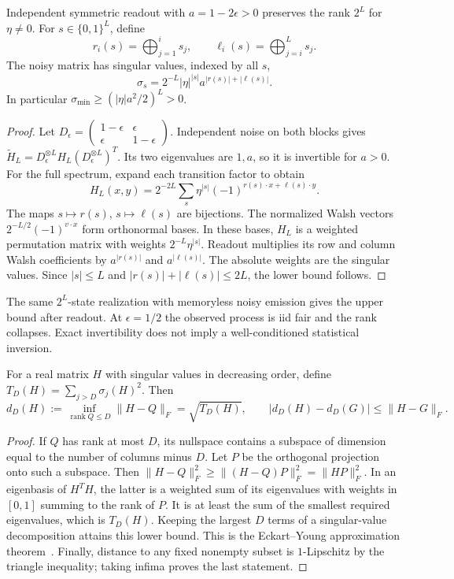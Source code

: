 \begin{theorem}\label{op:noisy-rank}
Independent symmetric readout with \(a=1-2\epsilon>0\) preserves the
rank \(2^L\) for \(\eta\ne0\).
For \(s\in\{0,1\}^L\), define
\[
 r_i(s)=\bigoplus_{j=1}^i s_j,\qquad
 \ell_i(s)=\bigoplus_{j=i}^L s_j .
 \]
The noisy matrix has singular values, indexed by all \(s\),
\[
 \sigma_s=2^{-L}|\eta|^{|s|}
                  a^{|r(s)|+|\ell(s)|}.
\]
In particular \(\sigma_{\min}\ge (|\eta|a^2/2)^L>0\).
\end{theorem}
\begin{proof}
Let \(D_\epsilon=\left(\begin{smallmatrix}1-\epsilon&\epsilon\\
\epsilon&1-\epsilon\end{smallmatrix}\right)\).
Independent noise on both blocks gives
\(\widetilde H_L=D_\epsilon^{\otimes L}H_L
(D_\epsilon^{\otimes L})^T\).
Its two eigenvalues are \(1,a\), so it is invertible for \(a>0\).
For the full spectrum, expand each transition factor to obtain
\[
 H_L(x,y)=2^{-2L}\sum_s\eta^{|s|}
             (-1)^{r(s)\cdot x+\ell(s)\cdot y}.
\]
The maps \(s\mapsto r(s)\), \(s\mapsto\ell(s)\) are bijections.
The normalized Walsh vectors
\(2^{-L/2}(-1)^{v\cdot x}\) form orthonormal bases.
In these bases, \(H_L\) is a weighted permutation matrix with weights
\(2^{-L}\eta^{|s|}\).  Readout multiplies its row and column Walsh
coefficients by \(a^{|r(s)|}\) and \(a^{|\ell(s)|}\).
The absolute weights are the singular values.  Since
\(|s|\le L\) and \(|r(s)|+|\ell(s)|\le2L\), the lower bound follows.
\end{proof}

The same \(2^L\)-state realization with memoryless noisy emission gives
the upper bound after readout.  At \(\epsilon=1/2\) the observed process
is iid fair and the rank collapses.  Exact invertibility does not imply
a well-conditioned statistical inversion.

\begin{lemma}\label{op:tail}
For a real matrix \(H\) with singular values in decreasing order, define
\(T_D(H)=\sum_{j>D}\sigma_j(H)^2\).
Then
\[
 d_D(H):=\inf_{\operatorname{rank}Q\le D}\|H-Q\|_F
       =\sqrt{T_D(H)},\qquad
 |d_D(H)-d_D(G)|\le\|H-G\|_F.
\]
\end{lemma}
\begin{proof}
If \(Q\) has rank at most \(D\), its nullspace contains a subspace of
dimension equal to the number of columns minus \(D\).  Let \(P\) be
the orthogonal projection onto such a subspace.
Then \(\|H-Q\|_F^2\ge\|(H-Q)P\|_F^2=\|HP\|_F^2\).
In an eigenbasis of \(H^TH\), the latter is a weighted sum of its
eigenvalues with weights in \([0,1]\) summing to the rank of \(P\).
It is at least the sum of the smallest required eigenvalues,
which is \(T_D(H)\).  Keeping the largest \(D\) terms of a singular-value
decomposition attains this lower bound.  This is the
Eckart--Young approximation theorem~\cite{op:eckart}.
Finally, distance to any fixed nonempty subset is \(1\)-Lipschitz by
the triangle inequality; taking infima proves the last statement.
\end{proof}

